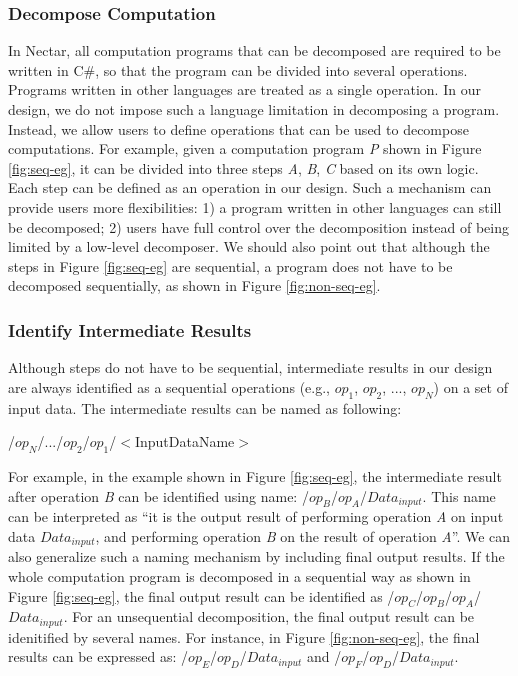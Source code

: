 \documentclass[journal]{IEEEtran}
\begin{document}
\subsubsection{Decompose Computation}
In Nectar, all computation programs that can be decomposed are required to be
written in C\#, so that the program can be divided into several operations.
Programs written in other languages are treated as a single operation.  In our
design, we do not impose such a language limitation in decomposing a program.
Instead, we allow users to define operations that can be used to decompose
computations.  For example, given a computation program {\it P} shown in Figure
\ref{fig:seq-eg}, it can be divided into three steps {\it A}, {\it B}, {\it C}
based on its own logic.  Each step can be defined as an operation in our design.
Such a mechanism can provide users more flexibilities: 1) a program written in
other languages can still be decomposed; 2) users have full control over the
decomposition instead of being limited by a low-level decomposer.  We should
also point out that although the steps in Figure \ref{fig:seq-eg} are
sequential, a program does not have to be decomposed sequentially, as shown in
Figure \ref{fig:non-seq-eg}.

\subsubsection{Identify Intermediate Results}
Although steps do not have to be sequential, intermediate results in our design
are always identified as a sequential operations (e.g., $op_1$, $op_2$, ..., $op_N$) on a
set of input data.  The intermediate results can be named as following:
\begin{center}
/$op_N$/.../$op_2$/$op_1$/$<$InputDataName$>$
\end{center}
For example, in the example shown in Figure \ref{fig:seq-eg}, the intermediate
result after operation {\it B} can be identified using name: /$op_B$/$op_A$/$
Data_{input}$.  This name can be interpreted as ``it is the output result of
performing operation {\it A} on input data $Data_{input}$, and performing
operation {\it B} on the result of operation {\it A}''.  We can also generalize
such a naming mechanism by including final output results.  If the whole
computation program is decomposed in a sequential way as shown in Figure
\ref{fig:seq-eg}, the final output result can be identified as
/$op_C$/$op_B$/$op_A$/$Data_{input}$.  For an unsequential decomposition, the
final output result can be idenitified by several names.  For instance, in
Figure \ref{fig:non-seq-eg}, the final results can be expressed as:
/$op_E$/$op_D$/$Data_{input}$ and /$op_F$/$op_D$/$Data_{input}$.
\end{document}
